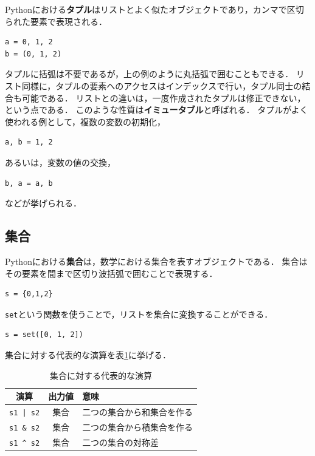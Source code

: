 \documentclass[a4paper,12pt]{jsarticle}
\begin{document}
Pythonにおける{\bf タプル}はリストとよく似たオブジェクトであり，カンマで区切られた要素で表現される．
\begin{lstlisting}[caption=タプルの例,label=tuple]
a = 0, 1, 2
b = (0, 1, 2)
\end{lstlisting}
タプルに括弧は不要であるが，上の例のように丸括弧で囲むこともできる．
リスト同様に，タプルの要素へのアクセスはインデックスで行い，タプル同士の結合も可能である．
リストとの違いは，一度作成されたタプルは修正できない，という点である．
このような性質は{\bf イミュータブル}と呼ばれる．
タプルがよく使われる例として，複数の変数の初期化，
\begin{lstlisting}[caption=複数の変数の初期化,label=tuple_init]
a, b = 1, 2
\end{lstlisting}
あるいは，変数の値の交換，
\begin{lstlisting}[caption=変数の値の交換,label=tuple_exchange]
b, a = a, b
\end{lstlisting}
などが挙げられる．

\subsection{集合}

Pythonにおける{\bf 集合}は，数学における集合を表すオブジェクトである．
集合はその要素を間まで区切り波括弧で囲むことで表現する．
\begin{lstlisting}[caption=集合の例,label=set]
s = {0,1,2}
\end{lstlisting}
\texttt{set}という関数を使うことで，リストを集合に変換することができる．
\begin{lstlisting}[caption=リストを集合に変換,label=set_list]
s = set([0, 1, 2])
\end{lstlisting}
集合に対する代表的な演算を表\ref{tab:set}に挙げる．

\begin{table}[H]
    \centering
    \caption{集合に対する代表的な演算}
    \begin{tabular}{c|c|l}
        \hline
        演算 & 出力値 & 意味 \\
        \hline\hline
        \texttt{s1 | s2} & 集合 & 二つの集合から和集合を作る \\
        \texttt{s1 \& s2} &集合 & 二つの集合から積集合を作る \\
        \texttt{s1 \^~s2} & 集合 & 二つの集合の対称差 \\
        \hline
    \end{tabular}
    \label{tab:set}
\end{table}
\end{document}

